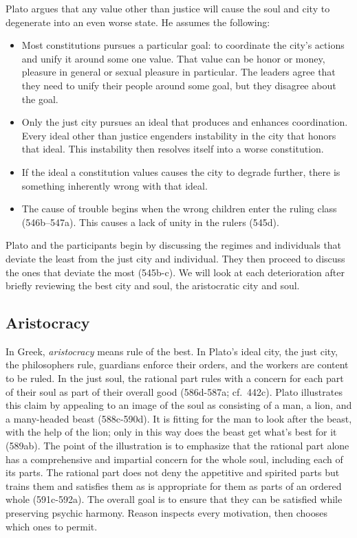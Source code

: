 \documentclass[oneside]{article}
\begin{document}
Plato argues that any value other than justice will cause the soul and
city to degenerate into an even worse state. He assumes the
following:

\begin{itemize}
\item
  Most constitutions pursues a particular goal: to coordinate the city's
  actions and unify it around some one value. That value can be honor or
  money, pleasure in general or sexual pleasure in particular. The
  leaders agree that they need to unify their people around some goal,
  but they disagree about the goal.
\item
  Only the just city pursues an ideal that produces and enhances
  coordination. Every ideal other than justice engenders instability in
  the city that honors that ideal. This instability then resolves itself
  into a worse constitution.
\item
  If the ideal a constitution values causes the city to degrade further,
  there is something inherently wrong with that ideal.

\item
  The cause of trouble begins when the wrong children enter the ruling
  class (546b--547a). This causes a lack of unity in the rulers (545d).
\end{itemize}
Plato and the participants begin by discussing the regimes and individuals that deviate the least from the just city and individual. They then proceed to discuss the ones that deviate the most (545b-c). We will look at each deterioration after briefly reviewing the best city and soul, the aristocratic city and soul.

\subsection*{Aristocracy}

In Greek, \emph{aristocracy} means rule of the best. In Plato's ideal
city, the just city, the philosophers rule, guardians enforce their
orders, and the workers are content to be ruled. In the just soul, the
rational part rules with a concern for each part of their soul as part
of their overall good (586d-587a; cf.~442c). Plato illustrates this
claim by appealing to an image of the soul as consisting of a man, a
lion, and a many-headed beast (588c-590d). It is fitting for the man to
look after the beast, with the help of the lion; only in this way does
the beast get what's best for it (589ab). The point of the illustration
is to emphasize that the rational part alone has a comprehensive and
impartial concern for the whole soul, including each of its parts. The
rational part does not deny the appetitive and spirited parts but trains
them and satisfies them as is appropriate for them as parts of an
ordered whole (591c-592a). The overall goal is to ensure that they can
be satisfied while preserving psychic harmony. Reason inspects every
motivation, then chooses which ones to permit.
\end{document}
